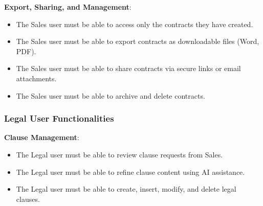 \textbf{Export, Sharing, and Management}:\vspace{0.4em}
\begin{adjustwidth}{3em}{1em}
    \begin{itemize}
        \item The Sales user must be able to access only the contracts they have created.\vspace{0.4em}
        \item The Sales user must be able to export contracts as downloadable files (Word, PDF).\vspace{0.4em}
        \item The Sales user must be able to share contracts via secure links or email attachments.\vspace{0.4em}
        \item The Sales user must be able to archive and delete contracts.
    \end{itemize}
\end{adjustwidth}\vspace{0.85em}  

\subsubsection{Legal User Functionalities}

\textbf{Clause Management}:\vspace{0.4em}
\begin{adjustwidth}{3em}{1em}
    \begin{itemize}
        \item The Legal user must be able to review clause requests from Sales.\vspace{0.4em}
        \item The Legal user must be able to refine clause content using AI assistance.\vspace{0.4em}
        \item The Legal user must be able to create, insert, modify, and delete legal clauses.  
    \end{itemize}
\end{adjustwidth}\vspace{0.85em} 

